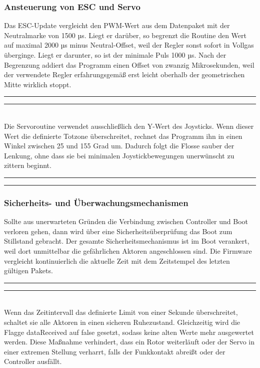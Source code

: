 \documentclass[a4paper,12pt]{article}
\begin{document}
\subsubsection{Ansteuerung von ESC und Servo}
Das ESC-Update vergleicht den PWM-Wert aus dem Datenpaket mit der Neutralmarke von 1500 µs. Liegt er darüber, so begrenzt die Routine den Wert auf maximal 2000 µs minus Neutral-Offset, weil der Regler sonst sofort in Vollgas überginge. Liegt er darunter, so ist der minimale Puls 1000 µs. Nach der Begrenzung addiert das Programm einen Offset von zwanzig Mikrosekunden, weil der verwendete Regler erfahrungsgemäß erst leicht oberhalb der geometrischen Mitte wirklich stoppt.
\newline\noindent\rule{\linewidth}{0.4pt}  %

\noindent\rule{\linewidth}{0.4pt}\\[0.5em]  %
Die Servoroutine verwendet ausschließlich den Y-Wert des Joysticks. Wenn dieser Wert die definierte Totzone überschreitet, rechnet das Programm ihn in einen Winkel zwischen 25 und 155 Grad um. Dadurch folgt die Flosse sauber der Lenkung, ohne dass sie bei minimalen Joystickbewegungen unerwünscht zu zittern beginnt.
\newline\noindent\rule{\linewidth}{0.4pt}  %

\noindent\rule{\linewidth}{0.4pt}  %
\subsubsection*{Sicherheits- und Überwachungsmechanismen}
Sollte aus unerwarteten Gründen die Verbindung zwischen Controller und Boot verloren gehen, dann wird über eine Sicherheitsüberprüfung das Boot zum Stillstand gebracht. Der gesamte Sicherheitsmechanismus ist im Boot verankert, weil dort unmittelbar die gefährlichen Aktoren angeschlossen sind. Die Firmware vergleicht kontinuierlich die aktuelle Zeit mit dem Zeitstempel des letzten gültigen Pakets. 
\newline\noindent\rule{\linewidth}{0.4pt}  %

\noindent\rule{\linewidth}{0.4pt}\\[0.5em]  %
Wenn das Zeitintervall das definierte Limit von einer Sekunde überschreitet, schaltet sie alle Aktoren in einen sicheren Ruhezustand. Gleichzeitig wird die Flagge dataReceived auf false gesetzt, sodass keine alten Werte mehr ausgewertet werden. Diese Maßnahme verhindert, dass ein Rotor weiterläuft oder der Servo in einer extremen Stellung verharrt, falls der Funkkontakt abreißt oder der Controller ausfällt.
\end{document}
